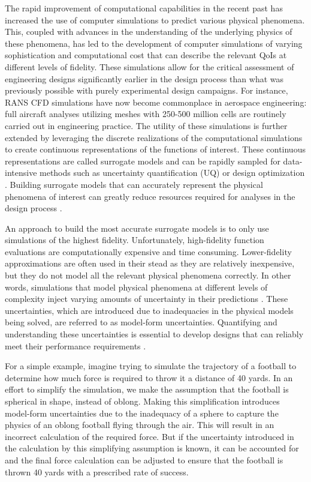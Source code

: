The rapid improvement of computational capabilities in the recent past has increased the use of computer simulations to predict various physical phenomena. This, coupled with advances in the understanding of the underlying physics of these phenomena, has led to the development of computer simulations of varying sophistication and computational cost that can describe the relevant QoIs at different levels of fidelity. These simulations allow for the critical assessment of engineering designs significantly earlier in the design process than what was previously possible with purely experimental design campaigns. For instance, RANS CFD simulations have now become commonplace in aerospace engineering: full aircraft analyses utilizing meshes with 250-500 million cells are routinely carried out in engineering practice. The utility of these simulations is further extended by leveraging the discrete realizations of the computational simulations to create continuous representations of the functions of interest. These continuous representations are called surrogate models and can be rapidly sampled for data-intensive methods such as uncertainty quantification (UQ) or design optimization \cite{queipo2005surrogate,gorissen2010surrogate}. Building surrogate models that can accurately represent the physical phenomena of interest can greatly reduce resources required for analyses in the design process \cite{jeong2005efficient}.

An approach to build the most accurate surrogate models is to only use simulations of the highest fidelity. Unfortunately, high-fidelity function evaluations are computationally expensive and time consuming. Lower-fidelity approximations are often used in their stead as they are relatively inexpensive, but they do not model all the relevant physical phenomena correctly. In other words, simulations that model physical phenomena at different levels of complexity inject varying amounts of uncertainty in their predictions \cite{peherstorfer_survey_2018}. These uncertainties, which are introduced due to inadequacies in the physical models being solved, are referred to as model-form uncertainties. Quantifying and understanding these uncertainties is essential to develop designs that can reliably meet their performance requirements \cite{forrester_multi-fidelity_2007}. 

For a simple example, imagine trying to simulate the trajectory of a football to determine how much force is required to throw it a distance of 40 yards. In an effort to simplify the simulation, we make the assumption that the football is spherical in shape, instead of oblong. Making this simplification introduces model-form uncertainties due to the inadequacy of a sphere to capture the physics of an oblong football flying through the air. This will result in an incorrect calculation of the required force. But if the uncertainty introduced in the calculation by this simplifying assumption is known, it can be accounted for and the final force calculation can be adjusted to ensure that the football is thrown 40 yards with a prescribed rate of success. 

